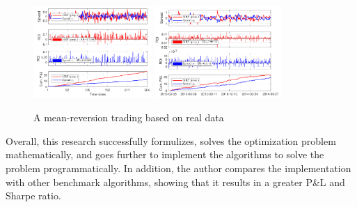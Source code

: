\begin{figure}[htb!]
    \centering
    \includegraphics[width=0.4\textwidth]{background/Images/rois1.png}
    \includegraphics[width=0.43\textwidth]{background/Images/rois2.png}
    \caption{A mean-reversion trading based on real data~\cite{ZipingZhao2019OMPW}}
    \label{fig:ROIsMRP}
\end{figure}

\noindent Overall, this research successfully formulizes, solves the optimization problem mathematically, and goes further to implement the algorithms to solve the problem programmatically. In addition, the author compares the implementation with other benchmark algorithms, showing that it results in a greater P\&L and Sharpe ratio.

